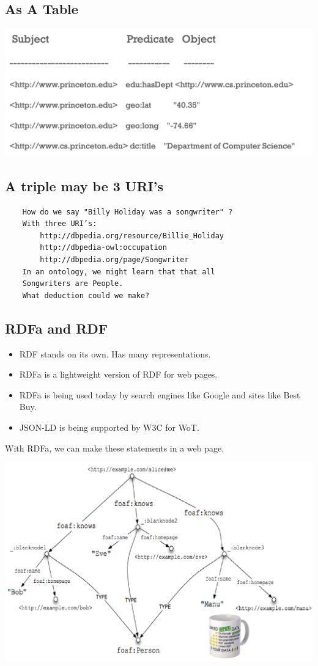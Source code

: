 \documentclass[11pt]{article}
\theoremstyle{definition}
\begin{document}
\subsection{As A Table}
\includegraphics[width=\textwidth/2]{12.png}

\subsection{A triple may be 3 URI’s}

\begin{verbatim}
    How do we say "Billy Holiday was a songwriter" ?
    With three URI’s:
        http://dbpedia.org/resource/Billie_Holiday
        http://dbpedia-owl:occupation
        http://dbpedia.org/page/Songwriter
    In an ontology, we might learn that that all 
    Songwriters are People.
    What deduction could we make?
\end{verbatim}

\subsection{RDFa and RDF}
\begin{itemize}
    \item RDF stands on its own. Has many representations.
    \item RDFa is a lightweight version of RDF for web pages.
    \item RDFa is being used today by search engines like Google and
    sites like Best Buy.
    \item JSON-LD is being supported by W3C for WoT.
\end{itemize}

With RDFa, we can make these statements in a web page.

\includegraphics[width=\textwidth/2]{13.png}
\end{document}
